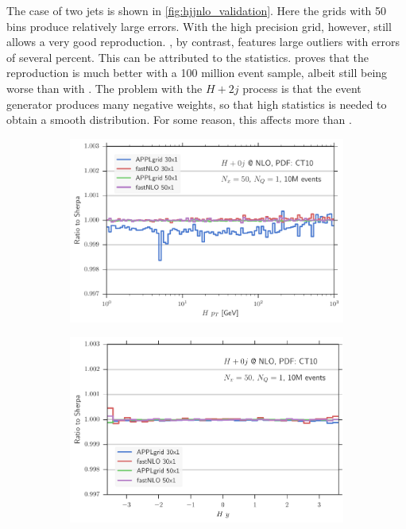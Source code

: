 The case of two jets is shown in \cref{fig:hjjnlo_validation}.
Here the grids with \num{50} bins produce relatively large errors.
With the high precision grid, however, \appl{} still allows a very good reproduction.
\fnlo{}, by contrast, features large outliers with errors of several percent.
This can be attributed to the statistics.
 proves that the reproduction is much better with a 100 million event sample, albeit still being worse than with \appl{}.
The problem with the $H + 2j$ process is that the event generator produces many negative weights, so that high statistics is needed to obtain a smooth distribution.
For some reason, this affects \fnlo{} more than \appl{}.
%
\begin{figure}
\centering
\begin{subfigure}[]{0.49\textwidth}
	\includegraphics[width=\textwidth]{images/hnlo_hpt_50v30.pdf}
\end{subfigure}
\hfill
\begin{subfigure}[]{0.49\textwidth}
	\includegraphics[width=\textwidth]{images/hnlo_hy_50v30.pdf}
\end{subfigure}


\end{figure}

